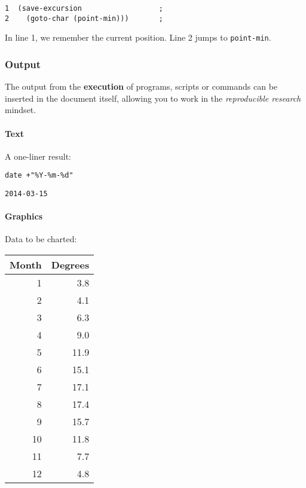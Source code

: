 \documentclass[11pt]{article}
\begin{document}
\begin{verbatim}
1  (save-excursion                  ;
2    (goto-char (point-min)))       ;
\end{verbatim}

In line 1, we remember the current position.  Line 2 jumps to
\texttt{point-min}.

\subsubsection*{Output}
\label{sec:orgb692c10}

The output from the \textbf{execution} of programs, scripts or commands can be inserted
in the document itself, allowing you to work in the \emph{reproducible research}
mindset.

\paragraph*{Text}
\label{sec:orgdc4ff8f}

A one-liner result:

\begin{verbatim}
date +"%Y-%m-%d"
\end{verbatim}

\begin{verbatim}
2014-03-15
\end{verbatim}

\paragraph*{Graphics}
\label{sec:org52fb2ad}

Data to be charted:

\begin{table}[htbp]
\label{tab:org846b394}
\centering
\begin{tabular}{rr}
Month & Degrees\\[0pt]
\hline
1 & 3.8\\[0pt]
2 & 4.1\\[0pt]
3 & 6.3\\[0pt]
4 & 9.0\\[0pt]
5 & 11.9\\[0pt]
6 & 15.1\\[0pt]
7 & 17.1\\[0pt]
8 & 17.4\\[0pt]
9 & 15.7\\[0pt]
10 & 11.8\\[0pt]
11 & 7.7\\[0pt]
12 & 4.8\\[0pt]
\end{tabular}
\end{table}
\end{document}
